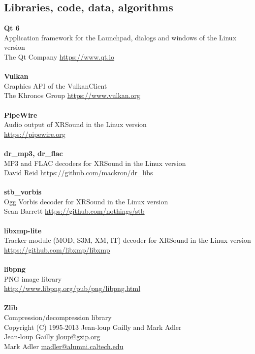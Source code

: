 \documentclass[Orbiter User Manual.tex]{subfiles}
\begin{document}
\subsection{Libraries, code, data, algorithms}
\textbf{Qt 6}\\
Application framework for the Launchpad, dialogs and windows of the Linux version\\
The Qt Company \url{https://www.qt.io}\\
\\
\textbf{Vulkan}\\
Graphics API of the VulkanClient\\
The Khronos Group \url{https://www.vulkan.org}\\
\\
\textbf{PipeWire}\\
Audio output of XRSound in the Linux version\\
\url{https://pipewire.org}\\
\\
\textbf{dr\_mp3, dr\_flac}\\
MP3 and FLAC decoders for XRSound in the Linux version\\
David Reid \url{https://github.com/mackron/dr_libs}\\
\\
\textbf{stb\_vorbis}\\
Ogg Vorbis decoder for XRSound in the Linux version\\
Sean Barrett \url{https://github.com/nothings/stb}\\
\\
\textbf{libxmp-lite}\\
Tracker module (MOD, S3M, XM, IT) decoder for XRSound in the Linux version\\
\url{https://github.com/libxmp/libxmp}\\
\\
\textbf{libpng}\\
PNG image library\\
\url{http://www.libpng.org/pub/png/libpng.html}\\
\\
\textbf{Zlib}\\
Compression/decompression library\\
Copyright (C) 1995-2013 Jean-loup Gailly and Mark Adler\\
Jean-loup Gailly \href{mailto:jloup@gzip.org}{jloup@gzip.org}\\
Mark Adler \href{mailto:madler@alumni.caltech.edu}{madler@alumni.caltech.edu}\\
\end{document}
